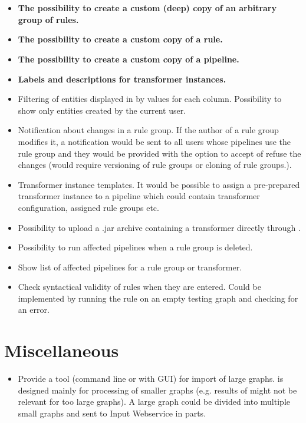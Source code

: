 \section{\FE}
\begin{itemize}
	\item \textbf{The possibility to create a custom (deep) copy of an arbitrary group of rules.}
	\item \textbf{The possibility to create a custom copy of a rule.}
	\item \textbf{The possibility to create a custom copy of a pipeline.}
	\item \textbf{Labels and descriptions for transformer instances.}
	\item Filtering of entities displayed in \FE by values for each column. Possibility to show only entities created by the current user.
	\item Notification about changes in a rule group. If the author of a rule group modifies it, a notification would be sent to all users whose pipelines use the rule group and they would be provided with the option to accept of refuse the changes (would require versioning of rule groups or cloning of rule groups.).
	\item Transformer instance templates. It would be possible to assign a pre-prepared transformer instance to a pipeline which could contain transformer configuration, assigned rule groups etc.
	\item Possibility to upload a .jar archive containing a transformer directly through \FE.
	\item Possibility to run affected pipelines when a rule group is deleted.
	\item Show list of affected pipelines for a rule group or transformer.
	\item Check syntactical validity of rules when they are entered. Could be implemented by running the rule on an empty testing graph and checking for an error.
\end{itemize}

\section{Miscellaneous}
\begin{itemize}
	\item Provide a tool (command line or with GUI) for import of large graphs. \odcs is designed mainly for processing of smaller graphs (e.g. results of \QA might not be relevant for too large graphs). A large graph could be divided into multiple small graphs and sent to Input Webservice in parts.
\end{itemize}

